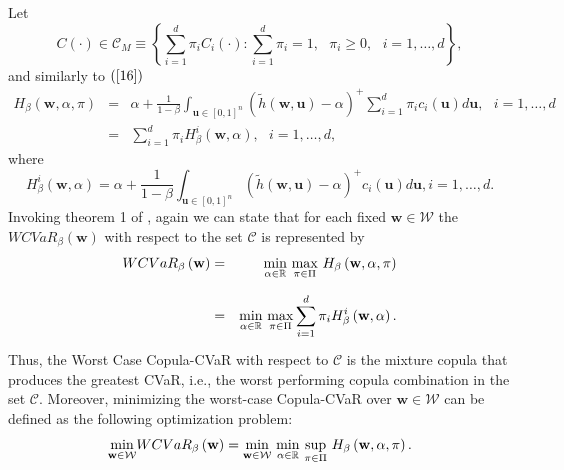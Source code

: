 \documentclass[a4paper,10pt]{article}
\begin{document}
Let
\begin{equation}
C\left( \cdot \right) \in \mathcal{C}_{M}\equiv \left\{ \sum_{i=1}^{d}\pi
_{i}C_{i}\left( \cdot \right) :\sum_{i=1}^{d}\pi _{i}=1,\text{ }\pi _{i}\geq
0,\text{ }i=1,\ldots,d\right\},  \label{28}
\end{equation}
and similarly to $\left( \ref{16}\right) $
\begin{eqnarray}
H_{\beta }\left( \mathbf{w},\alpha ,\pi \right) &=&\alpha +\frac{1}{1-\beta }%
\int_{\mathbf{u}\in \left[ 0,1\right] ^{n}}\left( \widetilde{h}\left( \mathbf{w,u}%
\right) -\alpha \right) ^{+}\sum_{i=1}^{d}\pi _{i}c_{i}\left( \mathbf{u}%
\right) d\mathbf{u},\text{ }i=1,\ldots,d  \label{28b} \\
&=&\sum_{i=1}^{d}\pi _{i}H_{\beta }^{i}\left( \mathbf{w},\alpha \right) ,%
\text{ }i=1,\ldots,d,\label{29}
\end{eqnarray}%
where
\begin{equation}
H_{\beta }^{i}\left( \mathbf{w},\alpha \right) =\alpha +\frac{1}{1-\beta }%
\int_{\mathbf{u}\in \left[ 0,1\right] ^{n}}\left( \widetilde{h}\left( \mathbf{w,u}%
\right) -\alpha \right) ^{+}c_{i}\left( \mathbf{u}\right) d\mathbf{u},\text{
}i=1,\ldots,d.  \label{30}
\end{equation}
Invoking theorem 1 of \citet*{zhu2009worst}, again we can state that for each fixed $\mathbf{w}\in \mathcal{W}$ the $WCVaR_{\beta }\left( \mathbf{w} \right) $ with respect to the set $\mathcal{C}$ is represented by
\begin{eqnarray}
WCVaR_{\beta }\left( \mathbf{w}\right) &=&\underset{}{\underset{\alpha \in
		\mathbb{R}
	}{\min }~\underset{\pi \in \Pi }{\max }}~H_{\beta }\left( \mathbf{w},\alpha
,\pi \right)  \notag \\
&=&\underset{}{\underset{\alpha \in	\mathbb{R}	}{\min }~\underset{\pi \in \Pi }{\max }}\sum_{i=1}^{d}\pi _{i}H_{\beta
}^{i}\left( \mathbf{w},\alpha \right).  \label{31}
\end{eqnarray}%
Thus, the Worst Case Copula-CVaR with respect to $\mathcal{C}$ is the mixture copula that produces the greatest CVaR, i.e., the worst performing copula combination in the set $\mathcal{C}$. Moreover, minimizing the worst-case Copula-CVaR over $\mathbf{w}\in \mathcal{W}$ can be defined as the following optimization problem:
\begin{equation}
\underset{\mathbf{w}\in \mathcal{W}}{\min }WCVaR_{\beta }\left( \mathbf{w}%
\right) =\underset{}{\underset{\mathbf{w}\in \mathcal{W}}{\min }~\underset{%
		\alpha \in	\mathbb{R}}{\min }~\underset{\pi \in \Pi }{\sup }}~H_{\beta }\left( \mathbf{w},\alpha,\pi \right).  \label{32}
\end{equation}
\end{document}
